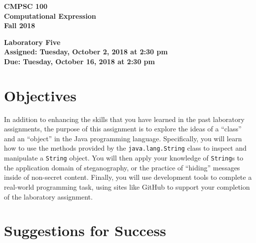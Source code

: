 \documentclass[11pt]{article}
\newcommand{\assignmentduedate}{October 16}
\newcommand{\assignmentassignedate}{October 2}
\newcommand{\assignmentnumber}{Five}
\newcommand{\labyear}{2018}
\newcommand{\labday}{Tuesday}
\newcommand{\labtime}{2:30 pm}
\newcommand{\assigneddate}{Assigned: \labday, \assignmentassignedate, \labyear{} at \labtime{}}
\newcommand{\duedate}{Due: \labday, \assignmentduedate, \labyear{} at \labtime{}}
\newcommand{\labtitle}[1]
{
  \begin{center}
    \begin{center}
      \bf
      CMPSC 100\\Computational Expression\\
      Fall 2018\\
      \medskip
    \end{center}
    \bf
    #1
  \end{center}
}
\begin{document}
\thispagestyle{empty}

\labtitle{Laboratory \assignmentnumber{} \\ \assigneddate{} \\ \duedate{}}

\section*{Objectives}

In addition to enhancing the skills that you have learned in the past laboratory
assignments, the purpose of this assignment is to explore the ideas of a
``class'' and an ``object'' in the Java programming language. Specifically, you
will learn how to use the methods provided by the {\tt java.lang.String} class
to inspect and manipulate a {\tt String} object. You will then apply your
knowledge of {\tt String}s to the application domain of steganography, or the
practice of ``hiding'' messages inside of non-secret content. Finally, you will
use development tools to complete a real-world programming task, using sites
like GitHub to support your completion of the laboratory assignment.

\section*{Suggestions for Success}
\end{document}
